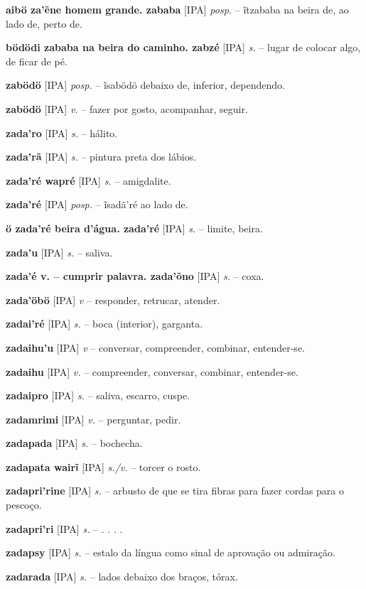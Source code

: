 {{{{{{\textbf{aibö za'ẽne homem grande. zababa} [IPA] \textit{posp.} -- ĩtzababa na beira de, ao lado de, perto de.

\textbf{bödödi zababa na beira do caminho. zabzé} [IPA] \textit{s.} -- lugar de colocar algo, de ficar de pé.

\textbf{zabödö} [IPA] \textit{posp.} -- ĩsabödö debaixo de, inferior, dependendo.

\textbf{zabödö} [IPA] \textit{v.} -- fazer por gosto, acompanhar, seguir.

\textbf{zada'ro} [IPA] \textit{s.} -- hálito.

\textbf{zada'rã} [IPA] \textit{s.} -- pintura preta dos lábios.

\textbf{zada'ré wapré} [IPA] \textit{s.} -- amigdalite.

\textbf{zada'ré} [IPA] \textit{posp.} -- ĩsadã'ré ao lado de.

\textbf{ö zada'ré beira d'água. zada'ré} [IPA] \textit{s.} -- limite, beira.

\textbf{zada'u} [IPA] \textit{s.} -- saliva.

\textbf{zada'é v. -- cumprir palavra. zada'õno} [IPA] \textit{s.} -- coxa.

\textbf{zada'öbö} [IPA] \textit{v} -- responder, retrucar, atender.

\textbf{zadai'ré} [IPA] \textit{s.} -- boca (interior), garganta.

\textbf{zadaihu'u} [IPA] \textit{v} -- conversar, compreender, combinar, entender-se.

\textbf{zadaihu} [IPA] \textit{v.} -- compreender, conversar, combinar, entender-se.

\textbf{zadaipro} [IPA] \textit{s.} -- saliva, escarro, cuspe.

\textbf{zadamrimi} [IPA] \textit{v.} -- perguntar, pedir.

\textbf{zadapada} [IPA] \textit{s.} -- bochecha.

\textbf{zadapata wairĩ} [IPA] \textit{s./v.} -- torcer o rosto.

\textbf{zadapri'rine} [IPA] \textit{s.} -- arbusto de que se tira fibras para fazer cordas para o pescoço.

\textbf{zadapri'ri} [IPA] \textit{s.} -- . . . .

\textbf{zadapsy} [IPA] \textit{s.} -- estalo da língua como sinal de aprovação ou admiração.

\textbf{zadarada} [IPA] \textit{s.} -- lados debaixo dos braços, tórax.

}}}}}}
